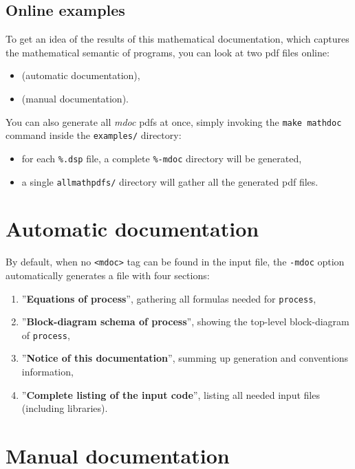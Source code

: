 \subsection{Online examples}
\label{mdoc-examples}

To get an idea of the results of this mathematical documentation, which captures the mathematical semantic of \faust programs, you can look at two pdf files online:
\begin{itemize}
\item {} (automatic documentation),
\item {} (manual documentation).
\end{itemize}

You can also generate all \emph{mdoc} pdfs at once, simply invoking the \lstinline!make mathdoc! command inside the \lstinline!examples/! directory: 
\begin{itemize}
\item for each \lstinline!%.dsp! file, a complete \lstinline!%-mdoc! directory will be generated,
\item a single \lstinline!allmathpdfs/! directory will gather all the generated pdf files.
\end{itemize}


\section{Automatic documentation}
\label{auto-docum}

By default, when no \lstinline!<mdoc>! tag can be found in the input \faust file, the \lstinline!-mdoc! option automatically generates a \latex file with four sections:
\begin{enumerate}
\item ''\textbf{Equations of process}'', gathering all formulas needed for \lstinline!process!,
\item ''\textbf{Block-diagram schema of process}'', showing the top-level block-diagram of \lstinline!process!,
\item ''\textbf{Notice of this documentation}'', summing up generation and conventions information,
\item ''\textbf{Complete listing of the input code}'', listing all needed input files (including libraries).
\end{enumerate}


\section{Manual documentation}
\label{manual-mdoc}


